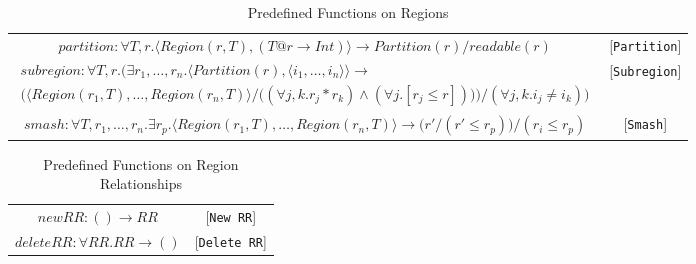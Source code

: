 \documentclass{article}
\begin{document}
\begin{table*}
\centering
{\small
\begin{tabular}{cc}

%
%
\begin{math}
partition : \forall T,r. \langle Region(r,T), (T@r \rightarrow Int) \rangle \rightarrow Partition(r) / readable(r)
\end{math} & [{\tt Partition}] \\

%
%
\begin{math}
\begin{array}{lc}
subregion : \forall T,r. \bigg( \exists r_1, \ldots, r_n . \langle Partition(r), \langle i_1, \ldots, i_n \rangle \rangle \rightarrow \\
	\Big( \langle Region(r_1,T), \ldots, Region(r_n,T) \rangle / \big((\forall j,k. r_j * r_k) \wedge (\forall j. [r_j \le r])\big)\Big) / (\forall j,k. i_j \ne i_k) \bigg)
\end{array}
\end{math} & [{\tt Subregion}] \\

%
%
\begin{math}
smash : \forall T,r_1,\ldots,r_n. \exists r_p. \langle Region(r_1,T), \ldots, Region(r_n,T) \rangle \rightarrow \big(r\prime / (r\prime \le r_p)\big) / (r_i \le r_p)
\end{math} & [{\tt Smash}] \\

\end{tabular}
}
\caption{Predefined Functions on Regions}
\end{table*}

\begin{table*}
\centering
{\small
\begin{tabular}{cc}

%
%
\begin{math}
newRR : () \rightarrow RR
\end{math} & [{\tt New RR}] \\

%
%
\begin{math}
deleteRR : \forall RR.RR \rightarrow ()
\end{math} & [{\tt Delete RR}] \\
\end{tabular}
}
\caption{Predefined Functions on Region Relationships}
\end{table*}
\end{document}
